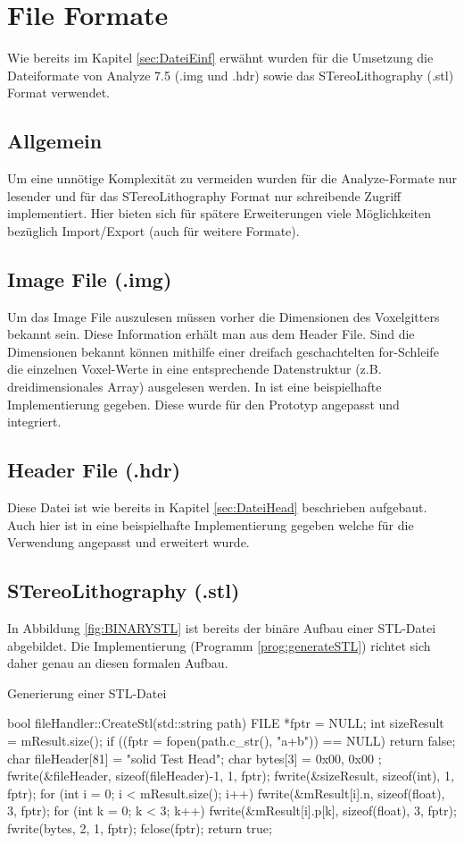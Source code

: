 \section{File Formate}
Wie bereits im Kapitel \ref{sec:DateiEinf} erwähnt wurden für die Umsetzung die Dateiformate von Analyze 7.5 (.img und .hdr) sowie das STereoLithography (.stl) Format verwendet.
\subsection{Allgemein}
Um eine unnötige Komplexität zu vermeiden wurden für die Analyze-Formate nur lesender und für das STereoLithography Format nur schreibende Zugriff implementiert. Hier bieten sich für spätere Erweiterungen viele Möglichkeiten bezüglich Import/Export (auch für weitere Formate). 
\subsection{Image File (.img)}
Um das Image File auszulesen müssen vorher die Dimensionen des Voxelgitters bekannt sein.  Diese Information erhält man aus dem Header File. Sind die Dimensionen bekannt können mithilfe einer dreifach geschachtelten for-Schleife die einzelnen Voxel-Werte in eine entsprechende Datenstruktur (z.B. dreidimensionales Array) ausgelesen werden. In \citep{AnalyzeFormat} ist eine beispielhafte Implementierung gegeben. Diese wurde für den Prototyp angepasst und integriert.
\subsection{Header File (.hdr)}
Diese Datei ist wie bereits in Kapitel \ref{sec:DateiHead} beschrieben aufgebaut. Auch hier ist in \citep{AnalyzeFormat} eine beispielhafte Implementierung gegeben welche für die Verwendung angepasst und erweitert wurde.
\subsection{STereoLithography (.stl)}
In Abbildung \ref{fig:BINARYSTL} ist bereits der binäre Aufbau einer STL-Datei abgebildet. Die Implementierung (Programm \ref{prog:generateSTL}) richtet sich daher genau an diesen formalen Aufbau.
\begin{program}
	\caption{Generierung einer STL-Datei}
	\label{prog:generateSTL}
	\begin{CCode}
		bool fileHandler::CreateStl(std::string path){
			FILE *fptr = NULL;	
			int sizeResult = mResult.size();
			if ((fptr = fopen(path.c_str(), "a+b")) == NULL)
				return false;
			char fileHeader[81] = "solid Test Head";
			char bytes[3] = { 0x00, 0x00 };
			fwrite(&fileHeader, sizeof(fileHeader)-1, 1, fptr);
			fwrite(&sizeResult, sizeof(int), 1, fptr);
			for (int i = 0; i < mResult.size(); i++) {
				fwrite(&mResult[i].n, sizeof(float), 3, fptr);
				for (int k = 0; k < 3; k++)  {
					fwrite(&mResult[i].p[k], sizeof(float), 3, fptr);
				}
				fwrite(bytes, 2, 1, fptr);
			}
			fclose(fptr);
			return true;
		}
	\end{CCode}
\end{program}
